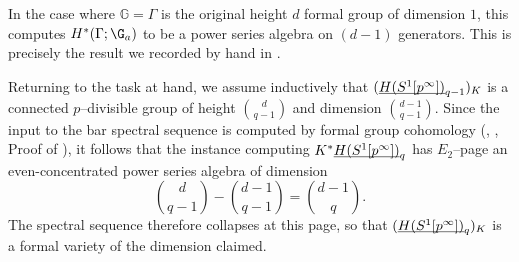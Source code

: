 \begin{remark}
In the case where $\mathbb G = \Gamma$ is the original height $d$ formal group of dimension $1$, this computes $H^*(\Gamma; \G_a)$ to be a power series algebra on $(d-1)$ generators.  This is precisely the result we recorded by hand in .
\end{remark}

\noindent Returning to the task at hand, we assume inductively that $(\underline{\smash{H(S^1[p^\infty])}}_{q-1})_K$ is a connected $p$--divisible group of height $\binom{d}{q-1}$ and dimension $\binom{d-1}{q-1}$.  Since the input to the bar spectral sequence is computed by formal group cohomology (\cite{LazarevDeformations}, \cite[Example 2.3.5]{HopkinsLurie}, Proof of ), it follows that the instance computing $K^* \underline{\smash{H(S^1[p^\infty])}}_{q}$ has $E_2$--page an even-concentrated power series algebra of dimension \[\binom{d}{q-1} - \binom{d-1}{q-1} = \binom{d-1}{q}.\]  The spectral sequence therefore collapses at this page, so that $(\underline{\smash{H(S^1[p^\infty])}}_{q})_K$ is a formal variety of the dimension claimed.

